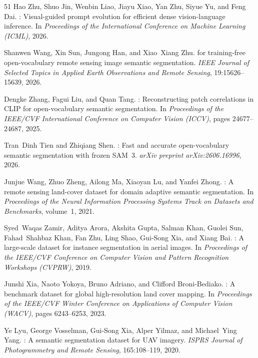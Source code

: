 \begin{thebibliography}{51}
Hao Zhu, Shuo Jin, Wenbin Liao, Jiayu Xiao, Yan Zhu, Siyue Yu, and Feng Dai.
: Visual-guided prompt evolution for efficient dense
  vision-language inference.
\newblock In \emph{Proceedings of the International Conference on Machine
  Learning (ICML)}, 2026.

Shanwen Wang, Xin Sun, Jungong Han, and Xiao~Xiang Zhu.
 for training-free open-vocabulary remote sensing image
  semantic segmentation.
\newblock \emph{IEEE Journal of Selected Topics in Applied Earth Observations
  and Remote Sensing}, 19:15626--15639, 2026.
\newblock {}

Dengke Zhang, Fagui Liu, and Quan Tang.
: Reconstructing patch correlations in {CLIP} for
  open-vocabulary semantic segmentation.
\newblock In \emph{Proceedings of the IEEE/CVF International Conference on
  Computer Vision (ICCV)}, pages 24677--24687, 2025.
\newblock {}

Tran~Dinh Tien and Zhiqiang Shen.
: Fast and accurate open-vocabulary semantic
  segmentation with frozen {SAM}~3.
\newblock \emph{arXiv preprint arXiv:2606.16996}, 2026.

Junjue Wang, Zhuo Zheng, Ailong Ma, Xiaoyan Lu, and Yanfei Zhong.
: A remote sensing land-cover dataset for domain adaptive
  semantic segmentation.
\newblock In \emph{Proceedings of the Neural Information Processing Systems
  Track on Datasets and Benchmarks}, volume~1, 2021.

Syed~Waqas Zamir, Aditya Arora, Akshita Gupta, Salman Khan, Guolei Sun,
  Fahad~Shahbaz Khan, Fan Zhu, Ling Shao, Gui-Song Xia, and Xiang Bai.
: A large-scale dataset for instance segmentation in aerial
  images.
\newblock In \emph{Proceedings of the IEEE/CVF Conference on Computer Vision
  and Pattern Recognition Workshops (CVPRW)}, 2019.

Junshi Xia, Naoto Yokoya, Bruno Adriano, and Clifford Broni-Bediako.
: A benchmark dataset for global high-resolution land
  cover mapping.
\newblock In \emph{Proceedings of the IEEE/CVF Winter Conference on
  Applications of Computer Vision (WACV)}, pages 6243--6253, 2023.
\newblock {}

Ye Lyu, George Vosselman, Gui-Song Xia, Alper Yilmaz, and Michael~Ying Yang.
: A semantic segmentation dataset for {UAV} imagery.
\newblock \emph{ISPRS Journal of Photogrammetry and Remote Sensing},
  165:108--119, 2020.
\newblock {}


\end{thebibliography}
